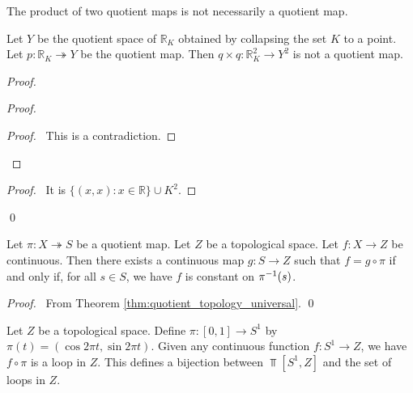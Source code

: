 \begin{ex}
The product of two quotient maps is not necessarily a quotient map.

Let $Y$ be the quotient space of $\mathbb{R}_K$ obtained by collapsing the set $K$ to a point. Let $p : \mathbb{R}_K \twoheadrightarrow Y$ be the quotient map. Then $q \times q : \mathbb{R}_K^2 \rightarrow Y^2$ is not a quotient map.
\end{ex}

\begin{proof}
\pf
{}
\begin{proof}
	\qedstep
	\begin{proof}
		\pf\ This is a contradiction.
	\end{proof}
\end{proof}
\begin{proof}
	\pf\ It is $\{ (x,x) : x \in \mathbb{R} \} \cup K^2$.
\end{proof}
\qed
\end{proof}

\begin{prop}
Let $\pi : X \twoheadrightarrow S$ be a quotient map. Let $Z$ be a topological space. Let $f : X \rightarrow Z$ be continuous. Then there exists a continuous map $g : S \rightarrow Z$ such that $f = g \circ \pi$ if and only if, for all $s \in S$, we have $f$ is constant on ${\pi}^{-1}(s)$.
\end{prop}

\begin{proof}
\pf\ From Theorem \ref{thm:quotient_topology_universal}. \qed
\end{proof}

\begin{prop}
Let $Z$ be a topological space. Define $\pi : [0,1] \rightarrow S^1$ by $\pi(t) = (\cos 2 \pi t, \sin 2 \pi t)$. Given any continuous function $f : S^1 \rightarrow Z$, we have $f \circ \pi$ is a loop in $Z$. This defines a bijection between $\Top[S^1,Z]$ and the set of loops in $Z$.
\end{prop}

